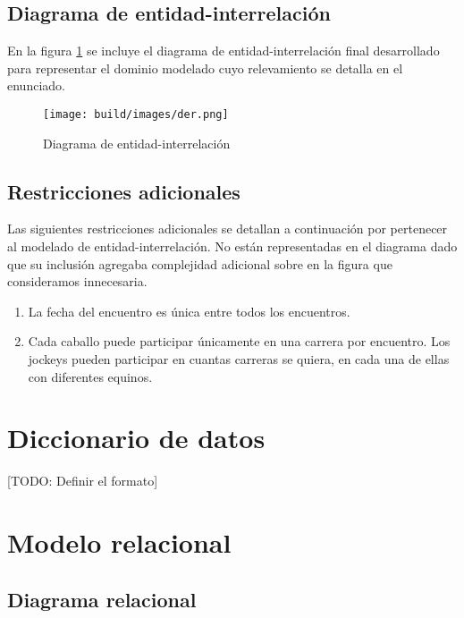 \documentclass[a4paper,11pt]{article}
\begin{document}
\subsection{Diagrama de entidad-interrelación}

En la figura \ref{fig:der} se incluye el diagrama de entidad-interrelación
final desarrollado para representar el dominio modelado cuyo relevamiento se
detalla en el enunciado.

\begin{figure}[h!t]
  \centering
  \texttt{[image: build/images/der.png]}
  \caption{Diagrama de entidad-interrelación} \label{fig:der}
\end{figure}

\FloatBarrier

\subsection{Restricciones adicionales}

Las siguientes restricciones adicionales se detallan a continuación por
pertenecer al modelado de entidad-interrelación. No están representadas en el
diagrama dado que su inclusión agregaba complejidad adicional sobre en la
figura que consideramos innecesaria.

\begin{enumerate}

  \item La fecha del encuentro es única entre todos los encuentros.

  \item Cada caballo puede participar únicamente en una carrera por encuentro.
    Los jockeys pueden participar en cuantas carreras se quiera, en cada una de
    ellas con diferentes equinos.

\end{enumerate}

\section{Diccionario de datos}

[TODO: Definir el formato]

\section{Modelo relacional}

\subsection{Diagrama relacional}
\end{document}
